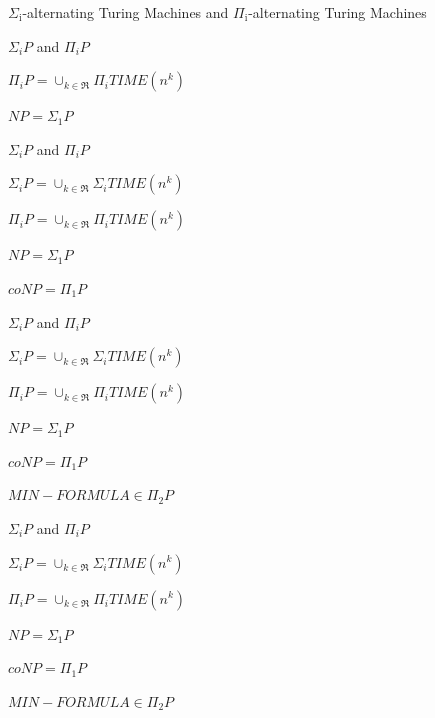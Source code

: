 \documentclass[presentation]{beamer}
\begin{document}
\begin{frame}[label={sec:orgfcecea4}]{\(\Sigma_{\text{i}}\)-alternating Turing Machines and \(\Pi_{\text{i}}\)-alternating Turing Machines}
\begin{block}{\(\Sigma_{i}P\) and \(\Pi _{i}P\)}
\begin{block}{\(\Pi_{i}P = \cup_{k \in \Re} \Pi_{i}TIME(n^{k})\)}
\end{block}
\begin{block}{\(NP = \Sigma_{1}P\)}
\end{block}
\end{block}
\begin{block}{\(\Sigma_{i}P\) and \(\Pi _{i}P\)}
\begin{block}{\(\Sigma_{i}P = \cup_{k \in \Re} \Sigma_{i}TIME(n^{k})\)}
\end{block}
\begin{block}{\(\Pi_{i}P = \cup_{k \in \Re} \Pi_{i}TIME(n^{k})\)}
\end{block}
\begin{block}{\(NP = \Sigma_{1}P\)}
\end{block}
\begin{block}{\(coNP = \Pi_{1}P\)}
\end{block}
\end{block}
\begin{block}{\(\Sigma_{i}P\) and \(\Pi _{i}P\)}
\begin{block}{\(\Sigma_{i}P = \cup_{k \in \Re} \Sigma_{i}TIME(n^{k})\)}
\end{block}
\begin{block}{\(\Pi_{i}P = \cup_{k \in \Re} \Pi_{i}TIME(n^{k})\)}
\end{block}
\begin{block}{\(NP = \Sigma_{1}P\)}
\end{block}
\begin{block}{\(coNP = \Pi_{1}P\)}
\end{block}
\begin{block}{\(MIN-FORMULA \in \Pi_{2}P\)}
\end{block}
\end{block}
\begin{block}{\(\Sigma_{i}P\) and \(\Pi _{i}P\)}
\begin{block}{\(\Sigma_{i}P = \cup_{k \in \Re} \Sigma_{i}TIME(n^{k})\)}
\end{block}
\begin{block}{\(\Pi_{i}P = \cup_{k \in \Re} \Pi_{i}TIME(n^{k})\)}
\end{block}
\begin{block}{\(NP = \Sigma_{1}P\)}
\end{block}
\begin{block}{\(coNP = \Pi_{1}P\)}
\end{block}
\begin{block}{\(MIN-FORMULA \in \Pi_{2}P\)}

\end{block}
\end{block}
\end{frame}
\end{document}
